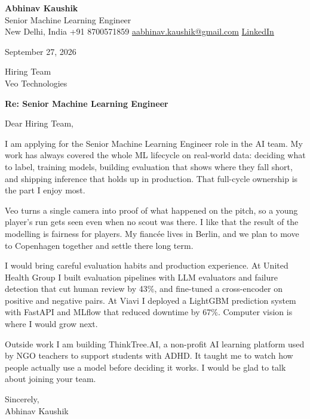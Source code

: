 \documentclass[11pt,a4paper]{article}
\begin{document}
{\Large\bfseries Abhinav Kaushik}\\
Senior Machine Learning Engineer\\
New Delhi, India \textbar{} +91 8700571859 \textbar{} \href{mailto:aabhinav.kaushik@gmail.com}{aabhinav.kaushik@gmail.com} \textbar{} \href{https://www.linkedin.com/in/abhinav-kaushik10/}{LinkedIn}  

September 27, 2026

Hiring Team\\
Veo Technologies

\textbf{Re: Senior Machine Learning Engineer}

Dear Hiring Team,

I am applying for the Senior Machine Learning Engineer role in the AI team. My work has always covered the whole ML lifecycle on real-world data: deciding what to label, training models, building evaluation that shows where they fall short, and shipping inference that holds up in production. That full-cycle ownership is the part I enjoy most.

Veo turns a single camera into proof of what happened on the pitch, so a young player's run gets seen even when no scout was there. I like that the result of the modelling is fairness for players. My fiancée lives in Berlin, and we plan to move to Copenhagen together and settle there long term.

I would bring careful evaluation habits and production experience. At United Health Group I built evaluation pipelines with LLM evaluators and failure detection that cut human review by 43\%, and fine-tuned a cross-encoder on positive and negative pairs. At Viavi I deployed a LightGBM prediction system with FastAPI and MLflow that reduced downtime by 67\%. Computer vision is where I would grow next.

Outside work I am building ThinkTree.AI, a non-profit AI learning platform used by NGO teachers to support students with ADHD. It taught me to watch how people actually use a model before deciding it works. I would be glad to talk about joining your team.

Sincerely,\\[4pt]
Abhinav Kaushik
\end{document}
